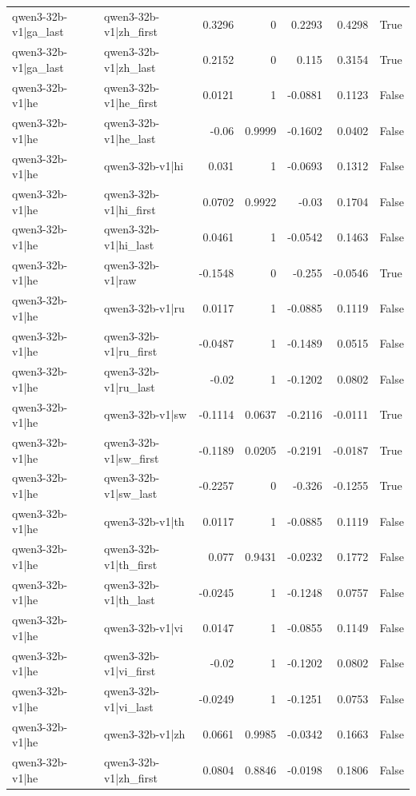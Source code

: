\begin{table}
\begin{tabular}{l l r r r r l}
qwen3-32b-v1|ga_last & qwen3-32b-v1|zh_first & 0.3296 & 0 & 0.2293 & 0.4298 & True \\
qwen3-32b-v1|ga_last & qwen3-32b-v1|zh_last & 0.2152 & 0 & 0.115 & 0.3154 & True \\
qwen3-32b-v1|he & qwen3-32b-v1|he_first & 0.0121 & 1 & -0.0881 & 0.1123 & False \\
qwen3-32b-v1|he & qwen3-32b-v1|he_last & -0.06 & 0.9999 & -0.1602 & 0.0402 & False \\
qwen3-32b-v1|he & qwen3-32b-v1|hi & 0.031 & 1 & -0.0693 & 0.1312 & False \\
qwen3-32b-v1|he & qwen3-32b-v1|hi_first & 0.0702 & 0.9922 & -0.03 & 0.1704 & False \\
qwen3-32b-v1|he & qwen3-32b-v1|hi_last & 0.0461 & 1 & -0.0542 & 0.1463 & False \\
qwen3-32b-v1|he & qwen3-32b-v1|raw & -0.1548 & 0 & -0.255 & -0.0546 & True \\
qwen3-32b-v1|he & qwen3-32b-v1|ru & 0.0117 & 1 & -0.0885 & 0.1119 & False \\
qwen3-32b-v1|he & qwen3-32b-v1|ru_first & -0.0487 & 1 & -0.1489 & 0.0515 & False \\
qwen3-32b-v1|he & qwen3-32b-v1|ru_last & -0.02 & 1 & -0.1202 & 0.0802 & False \\
qwen3-32b-v1|he & qwen3-32b-v1|sw & -0.1114 & 0.0637 & -0.2116 & -0.0111 & True \\
qwen3-32b-v1|he & qwen3-32b-v1|sw_first & -0.1189 & 0.0205 & -0.2191 & -0.0187 & True \\
qwen3-32b-v1|he & qwen3-32b-v1|sw_last & -0.2257 & 0 & -0.326 & -0.1255 & True \\
qwen3-32b-v1|he & qwen3-32b-v1|th & 0.0117 & 1 & -0.0885 & 0.1119 & False \\
qwen3-32b-v1|he & qwen3-32b-v1|th_first & 0.077 & 0.9431 & -0.0232 & 0.1772 & False \\
qwen3-32b-v1|he & qwen3-32b-v1|th_last & -0.0245 & 1 & -0.1248 & 0.0757 & False \\
qwen3-32b-v1|he & qwen3-32b-v1|vi & 0.0147 & 1 & -0.0855 & 0.1149 & False \\
qwen3-32b-v1|he & qwen3-32b-v1|vi_first & -0.02 & 1 & -0.1202 & 0.0802 & False \\
qwen3-32b-v1|he & qwen3-32b-v1|vi_last & -0.0249 & 1 & -0.1251 & 0.0753 & False \\
qwen3-32b-v1|he & qwen3-32b-v1|zh & 0.0661 & 0.9985 & -0.0342 & 0.1663 & False \\
qwen3-32b-v1|he & qwen3-32b-v1|zh_first & 0.0804 & 0.8846 & -0.0198 & 0.1806 & False \\

\end{tabular}
\end{table}
